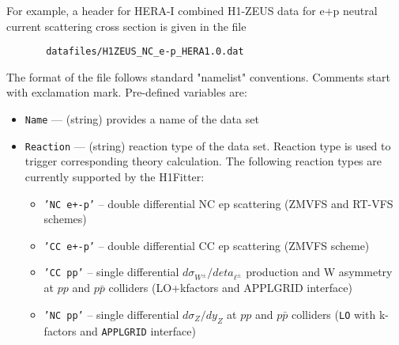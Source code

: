 \documentclass[11pt,a4paper]{article}
\begin{document}
   For example, a header for HERA-I combined H1-ZEUS data for e+p neutral 
   current scattering cross section is given in the file

\begin{verbatim}
       datafiles/H1ZEUS_NC_e-p_HERA1.0.dat
\end{verbatim}

   The format of the file follows standard "namelist" conventions. Comments 
   start with exclamation mark.  Pre-defined variables are:
\begin{itemize}
     \item{\tt Name}        --- (string) provides a name of the data set
    \item{\tt  Reaction}    --- (string) reaction type of the data set. Reaction type is used 
                      to trigger corresponding theory calculation. The following 
                      reaction types  are currently supported by the H1Fitter:
                      \begin{itemize}
                        \item {\tt 'NC e+-p'}  -- double differential NC ep scattering
                                      (ZMVFS and RT-VFS schemes) 
                        \item {\tt 'CC e+-p'}  -- double differential CC ep scattering
                                      (ZMVFS scheme)
                        \item {\tt 'CC pp'}    -- single differential $d \sigma_{W^{\pm}}/d eta_{\ell^{\pm}}$
                                      production and W asymmetry at $pp$ and $p\bar{p}$ 
                                      colliders (LO+kfactors and APPLGRID interface)
                        \item {\tt 'NC pp'}    -- single differential $d \sigma_Z / d y_Z$ at $pp$ and
                                      $p\bar{p}$ colliders
                                      ({\tt LO} with k-factors and {\tt APPLGRID} interface)


\end{itemize}
\end{itemize}
\end{document}
